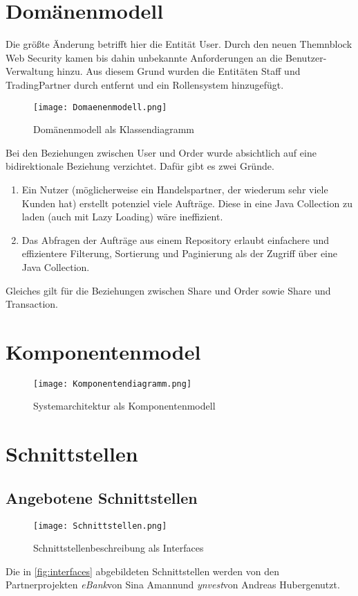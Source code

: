 \documentclass[12pt, a4paper, titlepage]{article}
\newcommand{\andi}[0]{Andreas Huber}
\newcommand{\andiProj}[0]{\textit{ynvest}}
\newcommand{\sina}[0]{Sina Amann}
\newcommand{\sinaProj}[0]{\textit{eBank}}
\begin{document}
\clearpage
\section{Domänenmodell}
Die größte Änderung betrifft hier die Entität User.
Durch den neuen Themnblock Web Security kamen bis dahin unbekannte
Anforderungen an die Benutzer-Verwaltung hinzu. Aus diesem Grund wurden
die Entitäten Staff und TradingPartner durch entfernt und ein Rollensystem
hinzugefügt.

\begin{figure}[H]
	\centering
    \texttt{[image: Domaenenmodell.png]}
	\caption{Domänenmodell als Klassendiagramm}
	\label{fig:domain}
\end{figure}

Bei den Beziehungen zwischen User und Order wurde absichtlich auf eine
bidirektionale Beziehung verzichtet. Dafür gibt es zwei Gründe.
\begin{enumerate}
	\item Ein Nutzer (möglicherweise ein Handelspartner, der wiederum sehr
	viele Kunden hat) erstellt potenziel viele Aufträge.
	Diese in eine Java Collection zu laden (auch mit Lazy Loading) wäre
	ineffizient.
	\item Das Abfragen der Aufträge aus einem Repository erlaubt einfachere
	und effizientere Filterung, Sortierung und Paginierung als der Zugriff
	über eine Java Collection.
\end{enumerate}
Gleiches gilt für die Beziehungen zwischen Share und Order sowie Share und
Transaction.

\section{Komponentenmodel}
\begin{figure}[H]
	\centering
    \texttt{[image: Komponentendiagramm.png]}
	\caption{Systemarchitektur als Komponentenmodell}
	\label{fig:components}
\end{figure}

\section{Schnittstellen}

\subsection{Angebotene Schnittstellen}
\label{subsec:Schnittstellen}
\begin{figure}[H]
	\centering
    \texttt{[image: Schnittstellen.png]}
	\caption{Schnittstellenbeschreibung als Interfaces}
	\label{fig:interfaces}
\end{figure}
Die in \autoref{fig:interfaces} abgebildeten Schnittstellen werden von den
Partnerprojekten \sinaProj von \sina und \andiProj von \andi genutzt.
\end{document}
